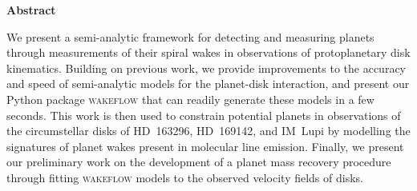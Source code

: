 {}

\begin{center}
    
    {\Large \textbf{Abstract}}
    
\end{center}

\noindent We present a semi-analytic framework for detecting and measuring planets through measurements of their spiral wakes in observations of protoplanetary disk kinematics.
Building on previous work, we provide improvements to the accuracy and speed of semi-analytic models for the planet-disk interaction, and present our Python package \textsc{wakeflow} that can readily generate these models in a few seconds.
This work is then used to constrain potential planets in observations of the circumstellar disks of HD~163296, HD~169142, and IM~Lupi by modelling the signatures of planet wakes present in molecular line emission.
Finally, we present our preliminary work on the development of a planet mass recovery procedure through fitting \textsc{wakeflow} models to the observed velocity fields of disks.

\newpage